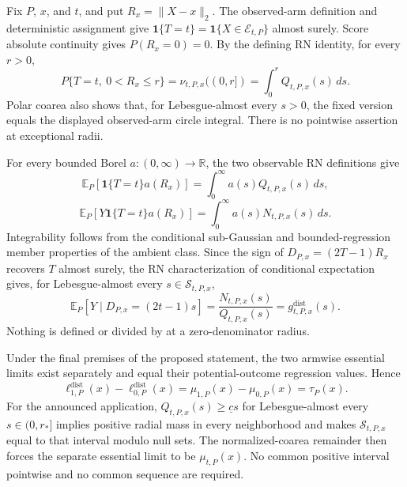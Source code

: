 Fix \(P\), \(x\), and \(t\), and put \(R_x=\lVert X-x\rVert_2\).  The observed-arm definition and deterministic assignment give \(\mathbf1\{T=t\}=\mathbf1\{X\in\mathcal E_{t,P}\}\) almost surely.  Score absolute continuity gives \(P(R_x=0)=0\).  By the defining RN identity, for every \(r>0\),
\[
 P\{T=t,\ 0<R_x\leq r\}
 =\nu_{t,P,x}((0,r])
 =\int_0^rQ_{t,P,x}(s)\,ds.
\]
Polar coarea also shows that, for Lebesgue-almost every \(s>0\), the fixed version equals the displayed observed-arm circle integral.  There is no pointwise assertion at exceptional radii.

For every bounded Borel \(a:(0,\infty)\to\mathbb R\), the two observable RN definitions give
\[
 \mathbb E_P[\mathbf1\{T=t\}a(R_x)]
 =\int_0^\infty a(s)Q_{t,P,x}(s)\,ds,
\]
\[
 \mathbb E_P[Y\mathbf1\{T=t\}a(R_x)]
 =\int_0^\infty a(s)N_{t,P,x}(s)\,ds.
\]
Integrability follows from the conditional sub-Gaussian and bounded-regression member properties of the ambient class.  Since the sign of \(D_{P,x}=(2T-1)R_x\) recovers \(T\) almost surely, the RN characterization of conditional expectation gives, for Lebesgue-almost every \(s\in\mathcal S_{t,P,x}\),
\[
 \mathbb E_P[Y\mid D_{P,x}=(2t-1)s]
 =\frac{N_{t,P,x}(s)}{Q_{t,P,x}(s)}
 =g^{\mathrm{dist}}_{t,P,x}(s).
\]
Nothing is defined or divided by at a zero-denominator radius.

Under the final premises of the proposed statement, the two armwise essential limits exist separately and equal their potential-outcome regression values.  Hence
\[
 \ell^{\mathrm{dist}}_{1,P}(x)-\ell^{\mathrm{dist}}_{0,P}(x)
 =\mu_{1,P}(x)-\mu_{0,P}(x)=\tau_P(x).
\]
For the announced application, \(Q_{t,P,x}(s)\geq\underline cs\) for Lebesgue-almost every \(s\in(0,r_*]\) implies positive radial mass in every neighborhood and makes \(\mathcal S_{t,P,x}\) equal to that interval modulo null sets.  The normalized-coarea remainder then forces the separate essential limit to be \(\mu_{t,P}(x)\).  No common positive interval pointwise and no common sequence are required.